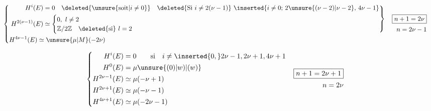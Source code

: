 
\[
\begin{aligned}
&\left\{\begin{aligned}
&\left.\begin{aligned}
H^i(E)&=0 \quad \deleted{\unsure{\text{soit}|i\ne0}}\quad
 \deleted{\text{Si }i\ne2(\nu-1)}\ 
 \inserted{i\ne0;\,2\unsure{(\nu-2)|\nu-2},\,4\nu-1}\\
H^{2(\nu-1)}(E)&\simeq\begin{cases}
0,\ l\ne 2\\
\mathbb Z/2\mathbb Z\quad \deleted{\text{si}}\ l=2
\end{cases}
\end{aligned}\right\}\\
&H^{4\nu-1}(E)\simeq\unsure{\mu|M}(-2\nu)
\end{aligned}\right.
&&\begin{aligned}\boxed{n+1=2\nu}\\ n=2\nu-1\end{aligned}
\end{aligned}
\]

\[
\begin{aligned}
&\left\{\begin{aligned}
H^{i}(E)&=0\qquad \text{si}\quad i\ne\inserted{0,}2\nu-1,2\nu+1,4\nu+1\\
H^0(E)&=\mu\unsure{(0)|w)|(w)}\\
H^{2\nu-1}(E)&\simeq\mu(-\nu+1)\\
H^{2\nu+1}(E)&\simeq\mu(-\nu-1)\\
H^{4\nu+1}(E)&\simeq\mu(-2\nu-1)
\end{aligned}\right.
&&\begin{aligned}\boxed{n+1=2\nu+1}\\n=2\nu\end{aligned}
\end{aligned}
\]
